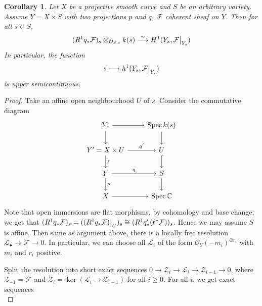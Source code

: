\documentclass{ctexart}
\newtheorem{corollary}{Corollary}[section]
\newcommand{\spec}{\operatorname{Spec}}
\begin{document}
\begin{corollary}
    Let $X$ be a projective smooth curve and $S$ be an arbitrary variety.
    Assume $Y = X \times S$ with two projections $p$ and $q$, $\mathcal{F}$ coherent sheaf on $Y$.
    Then for all $s\in S$,
    \begin{equation}
        (R^{1}q_{\ast}\mathcal{F})_{s} \otimes_{\mathcal{O}_{S, s}} k(s) \overset{\sim}{\longrightarrow} H^{1}(Y_{s}, \mathcal{F}\big{|}_{Y_{s}})
    \end{equation}
    In particular, the function
    \begin{equation}
        s \longmapsto h^{1}(Y_{s}, \mathcal{F}\big{|}_{Y_{s}})
    \end{equation}
    is upper semicontinuous.
    \label{Corollary 7.2}
\end{corollary}
\begin{proof}
    Take an affine open neighbourhood $U$ of $s$.
    Consider the commutative diagram
    \begin{equation}
        \begin{tikzcd}
            Y_{s} \arrow[r] \arrow[d] &
            \spec k(s) \arrow[d] \\
            Y' = X \times U \arrow[r, "{q'}"] \arrow[d, "\ell"] &
            U \arrow[d, hookrightarrow] \\
            Y \arrow[r, "q"] \arrow[d, "p"] &
            S \arrow[d] \\
            X \arrow[r] &
            \spec \mathbb{C}
        \end{tikzcd}
    \end{equation}
    Note that open immersions are flat morphisms, by cohomology and base change,
    we get that $(R^{1}q_{\ast}\mathcal{F})_{s} = ((R^{1}q_{\ast}\mathcal{F})\big{|}_{U})_{s} \cong (R^{1}q'_{\ast}(\ell^{\ast}\mathcal{F}))_{s}$.
    Hence we may assume $S$ is affine.
    Then same as argument above, there is a locally free resolution $\mathcal{L}_{\bullet} \rightarrow \mathcal{F} \rightarrow 0$.
    In particular, we can choose all $\mathcal{L}_{i}$ of the form $\mathcal{O}_{Y}(-m_{i})^{\oplus r_{i}}$ with $m_{i}$ and $r_{i}$ positive.
    \par
    Split the resolution into short exact sequences $0 \rightarrow \mathcal{Z}_{i} \rightarrow \mathcal{L}_{i} \rightarrow \mathcal{Z}_{i - 1} \rightarrow 0$,
    where $\mathcal{Z}_{-1} = \mathcal{F}$ and $\mathcal{Z}_{i} = \ker (\mathcal{L}_{i} \rightarrow \mathcal{Z}_{i - 1})$ for all $i \ge 0$.
    For all $i$, we get exact sequences
    \begin{equation}

\end{equation}
\end{proof}
\end{document}
